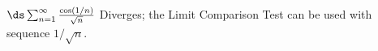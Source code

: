 {$\ds \sum_{n=1}^\infty \frac{\cos (1/n)}{\sqrt{n}}$
}
{Diverges; the Limit Comparison Test can be used with sequence $1/\sqrt{n}$. 
}